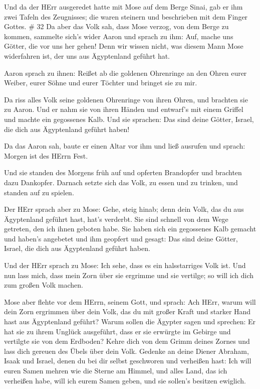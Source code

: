  Und da der HErr ausgeredet hatte mit Mose auf dem Berge
Sinai, gab er ihm zwei Tafeln des Zeugnisses; die waren steinern und
beschrieben mit dem Finger Gottes. \# 32  Da aber das Volk
sah, dass Mose verzog, von dem Berge zu kommen, sammelte sich's wider
Aaron und sprach zu ihm: Auf, mache uns Götter, die vor uns her gehen!
Denn wir wissen nicht, was diesem Mann Mose widerfahren ist, der uns aus
Ägyptenland geführt hat.

 Aaron sprach zu ihnen: Reißet ab die goldenen Ohrenringe an
den Ohren eurer Weiber, eurer Söhne und eurer Töchter und bringet sie zu
mir.

 Da riss alles Volk seine goldenen Ohrenringe von ihren
Ohren, und brachten sie zu Aaron.  Und er nahm sie von ihren
Händen und entwarf's mit einem Griffel und machte ein gegossenes Kalb.
Und sie sprachen: Das sind deine Götter, Israel, die dich aus
Ägyptenland geführt haben!

 Da das Aaron sah, baute er einen Altar vor ihm und ließ
ausrufen und sprach: Morgen ist des HErrn Fest.

 Und sie standen des Morgens früh auf und opferten
Brandopfer und brachten dazu Dankopfer. Darnach setzte sich das Volk, zu
essen und zu trinken, und standen auf zu spielen.

 Der HErr sprach aber zu Mose: Gehe, steig hinab; denn dein
Volk, das du aus Ägyptenland geführt hast, hat's verderbt. 
Sie sind schnell von dem Wege getreten, den ich ihnen geboten habe. Sie
haben sich ein gegossenes Kalb gemacht und haben's angebetet und ihm
geopfert und gesagt: Das sind deine Götter, Israel, die dich aus
Ägyptenland geführt haben.

 Und der HErr sprach zu Mose: Ich sehe, dass es ein
halsstarriges Volk ist.  Und nun lass mich, dass mein Zorn
über sie ergrimme und sie vertilge; so will ich dich zum großen Volk
machen.

 Mose aber flehte vor dem HErrn, seinem Gott, und sprach:
Ach HErr, warum will dein Zorn ergrimmen über dein Volk, das du mit
großer Kraft und starker Hand hast aus Ägyptenland geführt?
 Warum sollen die Ägypter sagen und sprechen: Er hat sie zu
ihrem Unglück ausgeführt, dass er sie erwürgte im Gebirge und vertilgte
sie von dem Erdboden? Kehre dich von dem Grimm deines Zornes und lass
dich gereuen des Übels über dein Volk.  Gedenke an deine
Diener Abraham, Isaak und Israel, denen du bei dir selbst geschworen und
verheißen hast: Ich will euren Samen mehren wie die Sterne am Himmel,
und alles Land, das ich verheißen habe, will ich eurem Samen geben, und
sie sollen's besitzen ewiglich.

